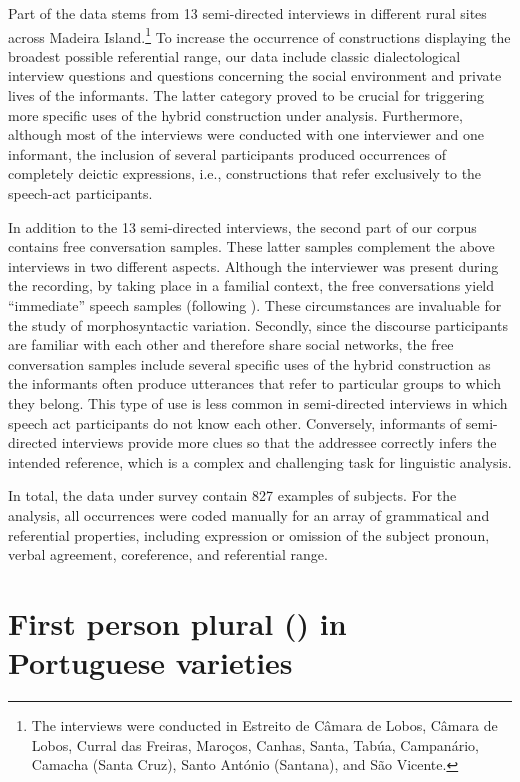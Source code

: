 \documentclass[output=paper]{langscibook}
\begin{document}
Part of the data stems from 13 semi-directed interviews in different rural sites across Madeira Island.\footnote{The interviews were conducted in Estreito de Câmara de Lobos, Câmara de Lobos, Curral das Freiras, Maroços, Canhas, Santa, Tabúa, Campanário, Camacha (Santa Cruz), Santo António (Santana), and São Vicente.} To increase the occurrence of constructions displaying the broadest possible referential range, our data include classic dialectological interview questions and questions concerning the social environment and private lives of the informants. The latter category proved to be crucial for triggering more specific uses of the hybrid construction under analysis. Furthermore, although most of the interviews were conducted with one interviewer and one informant, the inclusion of several participants produced occurrences of completely deictic expressions, i.e., constructions that refer exclusively to the speech-act participants.



In addition to the 13 semi-directed interviews, the second part of our corpus contains free conversation samples. These latter samples complement the above interviews in two different aspects. Although the interviewer was present during the recording, by taking place in a familial context, the free conversations yield “immediate” speech samples (following \citealt{KochOesterreicher1990}). These circumstances are invaluable for the study of morphosyntactic variation. Secondly, since the discourse participants are familiar with each other and therefore share social networks, the free conversation samples include several specific uses of the hybrid construction as the informants often produce utterances that refer to particular groups to which they belong. This type of use is less common in semi-directed interviews in which speech act participants do not know each other. Conversely, informants of semi-directed interviews provide more clues so that the addressee correctly infers the intended  reference, which is a complex and challenging task for linguistic analysis.



In total, the data under survey contain 827 examples of  subjects. For the analysis, all occurrences were coded manually for an array of grammatical and referential properties, including expression or omission of the subject pronoun, verbal agreement, coreference, and referential range.


\section{First person plural () in Portuguese varieties}\label{sec:henriques:3}
\end{document}

